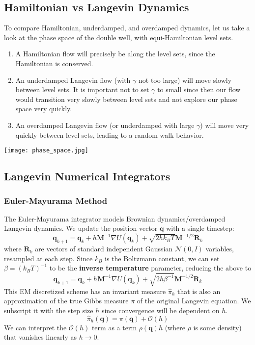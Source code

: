 \documentclass{article}
\theoremstyle{remark}
\theoremstyle{definition}
\begin{document}
\subsection{Hamiltonian vs Langevin Dynamics}
To compare Hamiltonian, underdamped, and overdamped dynamics, let us take a look at the phase space of the double well, with equi-Hamiltonian level sets. 
\begin{enumerate}
    \item A Hamiltonian flow will precisely be along the level sets, since the Hamiltonian is conserved. 
    \item An underdamped Langevin flow (with $\gamma$ not too large) will move slowly between level sets. It is important not to set $\gamma$ to small since then our flow would transition very slowly between level sets and not explore our phase space very quickly. 
    \item An overdamped Langevin flow (or underdamped with large $\gamma$) will move very quickly between level sets, leading to a random walk behavior. 
\end{enumerate}
\begin{center}
    \texttt{[image: phase\_space.jpg]}
\end{center}

\subsection{Langevin Numerical Integrators}

\subsubsection{Euler-Mayurama Method}
The Euler-Mayurama integrator models Brownian dynamics/overdamped Langevin dynamics. We update the position vector $\mathbf{q}$ with a single timestep: 
\[\mathbf{q}_{k+1} = \mathbf{q}_k + h \mathbf{M}^{-1} \nabla U(\mathbf{q}_k) + \sqrt{2 h k_B T} \mathbf{M}^{-1/2} \mathbf{R}_k\]
where $\mathbf{R}_k$ are vectors of standard independent Gaussian $\mathcal{N}(0, I)$ variables, resampled at each step. Since $k_B$ is the Boltzmann constant, we can set $\beta = (k_B T)^{-1}$ to be the \textbf{inverse temperature} parameter, reducing the above to 
\[\mathbf{q}_{k+1} = \mathbf{q}_k + h \mathbf{M}^{-1} \nabla U(\mathbf{q}_k) + \sqrt{2 h \beta^{-1}} \mathbf{M}^{-1/2} \mathbf{R}_k\]
This EM discretized scheme has an invariant measure $\hat{\pi}_h$ that is also an approximation of the true Gibbs measure $\pi$ of the original Langevin equation. We subscript it with the step size $h$ since convergence will be dependent on $h$. 
\[\hat{\pi}_h (\mathbf{q}) = \pi(\mathbf{q}) + \mathcal{O}(h)\]
We can interpret the $\mathcal{O}(h)$ term as a term $\rho(\mathbf{q}) h$ (where $\rho$ is some density) that vanishes linearly as $h \rightarrow 0$. 
\end{document}
